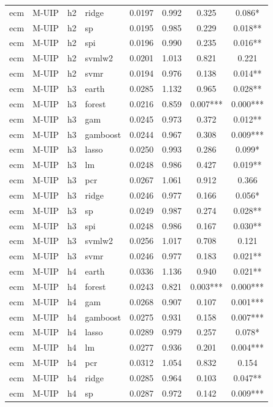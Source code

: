 \begin{ThreePartTable}
\begin{longtable}[t]{llclcccc}
ecm & M-UIP & h2 & ridge & 0.0197 & 0.992 & 0.325 & 0.086*\\
ecm & M-UIP & h2 & sp & 0.0195 & 0.985 & 0.229 & 0.018**\\
ecm & M-UIP & h2 & spi & 0.0196 & 0.990 & 0.235 & 0.016**\\
ecm & M-UIP & h2 & svmlw2 & 0.0201 & 1.013 & 0.821 & 0.221\\
ecm & M-UIP & h2 & svmr & 0.0194 & 0.976 & 0.138 & 0.014**\\
\addlinespace
ecm & M-UIP & h3 & earth & 0.0285 & 1.132 & 0.965 & 0.028**\\
ecm & M-UIP & h3 & forest & 0.0216 & 0.859 & 0.007*** & 0.000***\\
ecm & M-UIP & h3 & gam & 0.0245 & 0.973 & 0.372 & 0.012**\\
ecm & M-UIP & h3 & gamboost & 0.0244 & 0.967 & 0.308 & 0.009***\\
ecm & M-UIP & h3 & lasso & 0.0250 & 0.993 & 0.286 & 0.099*\\
ecm & M-UIP & h3 & lm & 0.0248 & 0.986 & 0.427 & 0.019**\\
ecm & M-UIP & h3 & pcr & 0.0267 & 1.061 & 0.912 & 0.366\\
ecm & M-UIP & h3 & ridge & 0.0246 & 0.977 & 0.166 & 0.056*\\
ecm & M-UIP & h3 & sp & 0.0249 & 0.987 & 0.274 & 0.028**\\
ecm & M-UIP & h3 & spi & 0.0248 & 0.986 & 0.167 & 0.030**\\
ecm & M-UIP & h3 & svmlw2 & 0.0256 & 1.017 & 0.708 & 0.121\\
ecm & M-UIP & h3 & svmr & 0.0246 & 0.977 & 0.183 & 0.021**\\
\addlinespace
ecm & M-UIP & h4 & earth & 0.0336 & 1.136 & 0.940 & 0.021**\\
ecm & M-UIP & h4 & forest & 0.0243 & 0.821 & 0.003*** & 0.000***\\
ecm & M-UIP & h4 & gam & 0.0268 & 0.907 & 0.107 & 0.001***\\
ecm & M-UIP & h4 & gamboost & 0.0275 & 0.931 & 0.158 & 0.007***\\
ecm & M-UIP & h4 & lasso & 0.0289 & 0.979 & 0.257 & 0.078*\\
ecm & M-UIP & h4 & lm & 0.0277 & 0.936 & 0.201 & 0.004***\\
ecm & M-UIP & h4 & pcr & 0.0312 & 1.054 & 0.832 & 0.154\\
ecm & M-UIP & h4 & ridge & 0.0285 & 0.964 & 0.103 & 0.047**\\
ecm & M-UIP & h4 & sp & 0.0287 & 0.972 & 0.142 & 0.009***\\

\end{longtable}
\end{ThreePartTable}
